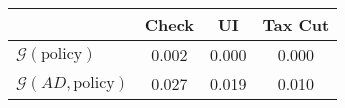 \begin{tabular}{@{}lccc@{}}
\toprule
                          & Check      & UI    & Tax Cut    \\  \midrule
$\mathcal{G}(\text{policy})$ & 0.002  & 0.000  & 0.000     \\
$\mathcal{G}(AD,\text{policy})$ & 0.027  & 0.019  & 0.010     \\
\end{tabular}
